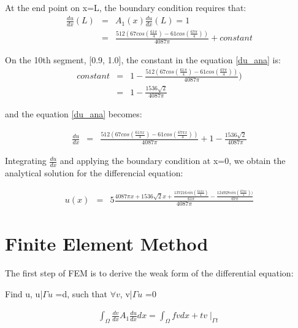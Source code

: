 \documentclass[paper=a4, fontsize=11pt]{article} %
\begin{document}
At the end point on x=L, the boundary condition requires that: 
\begin{eqnarray}
\frac{du}{dx}(L) &=& A_1(x)\frac{du}{dx} (L)=1 \nonumber\\
 &=&  \frac{512(67cos(\frac{61\pi }{4})- 61cos(\frac{67\pi }{4}))}{4087\pi} +constant 
\end{eqnarray}

On the 10th segment, [0.9, 1.0], the constant in the equation \ref{du_ana} is:
\begin{eqnarray}
constant &=& 1- \frac{512(67cos(\frac{61\pi }{4})- 61cos(\frac{67\pi}{4}))}{4087\pi}) \nonumber\\
&=& 1 - \frac{1536 \sqrt{2}}{4087\pi} 
\end{eqnarray}

and the equation \ref{du_ana} becomes:

\begin{eqnarray}
\frac{du}{dx} &=&\frac{512(67cos(\frac{61\pi x}{4})- 61cos(\frac{67\pi x}{4}))}{4087\pi} +1 - \frac{1536 \sqrt{2}}{4087\pi}
\end{eqnarray}

Integrating $\frac{du}{dx}$ and applying the boundary condition at x=0, we obtain the analytical solution for the differencial equation:

\begin{eqnarray}
u(x)&=& 5\frac{4087\pi x + 1536\sqrt{2}x + \frac{137216sin(\frac{61\pi x}{4})}{61\pi}- \frac{124928sin(\frac{67\pi x}{4}))}{67\pi}}{4087\pi}
\end{eqnarray}





\section{Finite Element Method}
The first step of FEM is to derive the weak form of the differential equation:

Find u, u|$\Gamma u$ =d, such that $\forall v$, v|$\Gamma u$ =0

\begin{eqnarray}
\int_{\Omega} \frac{dv}{dx} A_1 \frac{du}{dx} dx = \int_{\Omega} fv dx + tv \mid _{\Gamma t}
\end{eqnarray}
\end{document}
